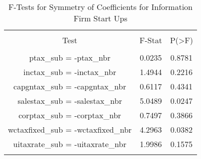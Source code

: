 
\begin{table}[!htbp] \centering 
  \caption{F-Tests for Symmetry of Coefficients for Information Firm Start Ups} 
  \label{51Ftests} 
\begin{tabular}{@{\extracolsep{5pt}} ccc} 
\\[-1.8ex]\hline 
\hline \\[-1.8ex] 
Test & F-Stat & P(\textgreater F) \\ 
\hline \\[-1.8ex] 
ptax\_sub = -ptax\_nbr & 0.0235 & 0.8781 \\ 
inctax\_sub = -inctax\_nbr & 1.4944 & 0.2216 \\ 
capgntax\_sub = -capgntax\_nbr & 0.6117 & 0.4341 \\ 
salestax\_sub = -salestax\_nbr & 5.0489 & 0.0247 \\ 
corptax\_sub = -corptax\_nbr & 0.7497 & 0.3866 \\ 
wctaxfixed\_sub = -wctaxfixed\_nbr & 4.2963 & 0.0382 \\ 
uitaxrate\_sub = -uitaxrate\_nbr & 1.9986 & 0.1575 \\ 
\hline \\[-1.8ex] 
\end{tabular} 
\end{table} 
